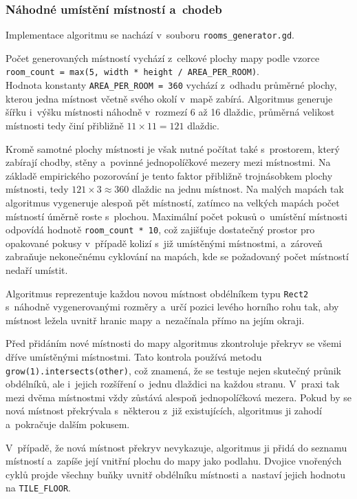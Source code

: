 \documentclass[
   program=itk,
   biblatex,
   figures=true,
   tables=true,
   glossaries,
   index
]{kidiplom}
\begin{document}
\subsubsection{Náhodné umístění místností a~chodeb}

Implementace algoritmu se nachází v~souboru \texttt{rooms\_generator.gd}.

Počet generovaných místností vychází z~celkové plochy mapy podle vzorce \\ \texttt{room\_count = max(5, width * height / AREA\_PER\_ROOM)}. \\ Hodnota konstanty \texttt{AREA\_PER\_ROOM = 360} vychází z~odhadu průměrné plochy, kterou jedna místnost včetně svého okolí v~mapě zabírá. Algoritmus generuje šířku i~výšku místnosti náhodně v~rozmezí 6 až 16 dlaždic, průměrná velikost místnosti tedy činí přibližně $11 \times 11 = 121$ dlaždic. 

Kromě samotné plochy místnosti je však nutné počítat také s~prostorem, který zabírají chodby, stěny a~povinné jednopolíčkové mezery mezi místnostmi. Na základě empirického pozorování je tento faktor přibližně trojnásobkem plochy místnosti, tedy $121 \times 3 \approx 360$ dlaždic na jednu místnost. Na malých mapách tak algoritmus vygeneruje alespoň pět místností, zatímco na velkých mapách počet místností úměrně roste s~plochou. Maximální počet pokusů o~umístění místnosti odpovídá hodnotě \texttt{room\_count * 10}, což zajišťuje dostatečný prostor pro opakované pokusy v~případě kolizí s~již umístěnými místnostmi, a~zároveň zabraňuje nekonečnému cyklování na mapách, kde se požadovaný počet místností nedaří umístit.

Algoritmus reprezentuje každou novou místnost obdélníkem typu \texttt{Rect2} s~náhodně vygenerovanými rozměry a~určí pozici levého horního rohu tak, aby místnost ležela uvnitř hranic mapy a~nezačínala přímo na jejím okraji.

Před přidáním nové místnosti do mapy algoritmus zkontroluje překryv se všemi dříve umístěnými místnostmi. Tato kontrola používá metodu \texttt{grow(1).intersects(other)}, což znamená, že se testuje nejen skutečný průnik obdélníků, ale i~jejich rozšíření o~jednu dlaždici na každou stranu. V~praxi tak mezi dvěma místnostmi vždy zůstává alespoň jednopolíčková mezera. Pokud by se nová místnost překrývala s~některou z~již existujících, algoritmus ji zahodí a~pokračuje dalším pokusem.

V~případě, že nová místnost překryv nevykazuje, algoritmus ji přidá do seznamu místností a~zapíše její vnitřní plochu do mapy jako podlahu. Dvojice vnořených cyklů projde všechny buňky uvnitř obdélníku místnosti a~nastaví jejich hodnotu na \texttt{TILE\_FLOOR}.
\end{document}
